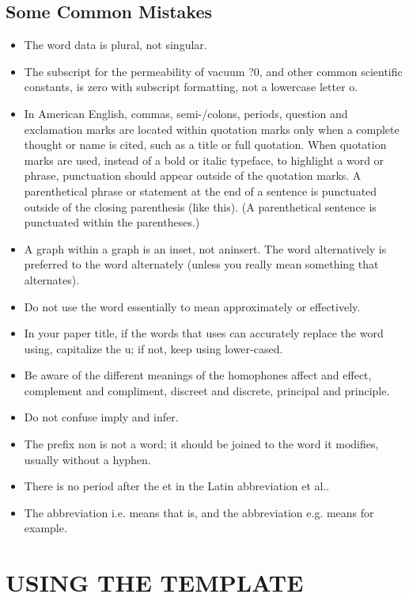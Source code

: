 \documentclass[letterpaper, 10 pt, conference]{ieeeconf}  %
\begin{document}
	\subsection{Some Common Mistakes}
	\begin{itemize}
		
		
		\item The word data is plural, not singular.
		\item The subscript for the permeability of vacuum ?0, and other common scientific constants, is zero with subscript formatting, not a lowercase letter o.
		\item In American English, commas, semi-/colons, periods, question and exclamation marks are located within quotation marks only when a complete thought or name is cited, such as a title or full quotation. When quotation marks are used, instead of a bold or italic typeface, to highlight a word or phrase, punctuation should appear outside of the quotation marks. A parenthetical phrase or statement at the end of a sentence is punctuated outside of the closing parenthesis (like this). (A parenthetical sentence is punctuated within the parentheses.)
		\item A graph within a graph is an inset, not aninsert. The word alternatively is preferred to the word alternately (unless you really mean something that alternates).
		\item Do not use the word essentially to mean approximately or effectively.
		\item In your paper title, if the words that uses can accurately replace the word using, capitalize the u; if not, keep using lower-cased.
		\item Be aware of the different meanings of the homophones affect and effect, complement and compliment, discreet and discrete, principal and principle.
		\item Do not confuse imply and infer.
		\item The prefix non is not a word; it should be joined to the word it modifies, usually without a hyphen.
		\item There is no period after the et in the Latin abbreviation et al..
		\item The abbreviation i.e. means that is, and the abbreviation e.g. means for example.
		
	\end{itemize}
	
	
	\section{USING THE TEMPLATE}
	
\end{document}
